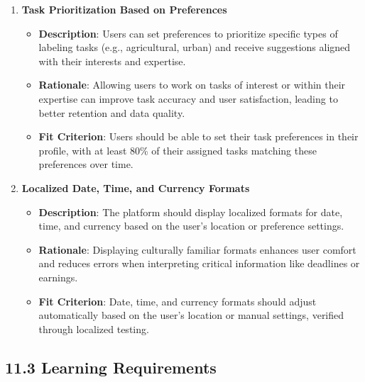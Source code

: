\documentclass[12pt]{article}
\begin{document}
\begin{enumerate}
    \item \textbf{Task Prioritization Based on Preferences}  
        \begin{itemize}
            \item \textbf{Description}: Users can set preferences to prioritize specific types of labeling tasks (e.g., agricultural, urban) and receive suggestions aligned with their interests and expertise.  
            \item \textbf{Rationale}: Allowing users to work on tasks of interest or within their expertise can improve task accuracy and user satisfaction, leading to better retention and data quality.  
            \item \textbf{Fit Criterion}: Users should be able to set their task preferences in their profile, with at least 80\% of their assigned tasks matching these preferences over time.
        \end{itemize}
    \item \textbf{Localized Date, Time, and Currency Formats}  
        \begin{itemize}
            \item \textbf{Description}: The platform should display localized formats for date, time, and currency based on the user's location or preference settings.  
            \item \textbf{Rationale}: Displaying culturally familiar formats enhances user comfort and reduces errors when interpreting critical information like deadlines or earnings.  
            \item \textbf{Fit Criterion}: Date, time, and currency formats should adjust automatically based on the user’s location or manual settings, verified through localized testing.
        \end{itemize}
\end{enumerate}

\subsection*{11.3 Learning Requirements}
\end{document}
